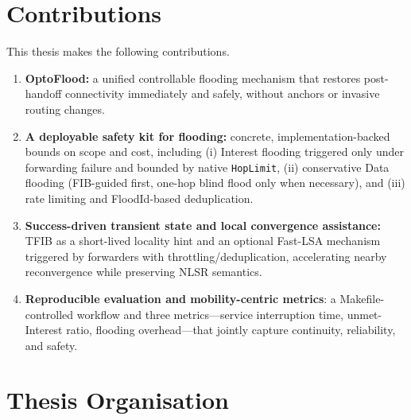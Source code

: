 
\section{Contributions}
\label{sec:introduction:contributions}

This thesis makes the following contributions.
\begin{enumerate}
  \item \textbf{OptoFlood:} a unified controllable flooding mechanism that restores post-handoff connectivity immediately and safely, without anchors or invasive routing changes.
  \item \textbf{A deployable safety kit for flooding:} concrete, implementation-backed bounds on scope and cost, including (i) Interest flooding triggered only under forwarding failure and bounded by native \texttt{HopLimit}, (ii) conservative Data flooding (FIB-guided first, one-hop blind flood only when necessary), and (iii) rate limiting and FloodId-based deduplication.
  \item \textbf{Success-driven transient state and local convergence assistance:} TFIB as a short-lived locality hint and an optional Fast-LSA mechanism triggered by forwarders with throttling/deduplication, accelerating nearby reconvergence while preserving NLSR semantics.
  \item \textbf{Reproducible evaluation and mobility-centric metrics}: a Makefile-controlled workflow and three metrics—service interruption time, unmet-Interest ratio, flooding overhead—that jointly capture continuity, reliability, and safety.
\end{enumerate}


\section{Thesis Organisation}
\label{sec:introduction:organisation}

